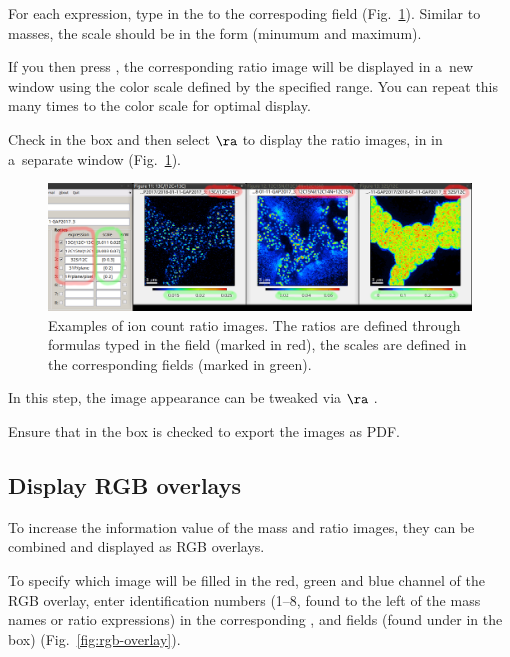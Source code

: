 \s For each expression, type in the  to the correspoding field (Fig.~\ref{fig:display-ratios}). Similar to masses, the scale should be in the form  (minumum and maximum). 

\bul If you then press , the corresponding ratio image will be displayed in a~new window using the color scale defined by the specified range. You can repeat this many times to  the color scale for optimal display.

\s Check  in the  box and then select  $\ra$  to display the ratio images, in in a~separate window (Fig.~\ref{fig:display-ratios}). 

\begin{figure}[!ht]
\centering
\includegraphics[width=\textwidth]{figs3/LANS-display-ratios}
\caption{\label{fig:display-ratios}%
Examples of ion count ratio images. The ratios are defined through formulas typed in the  field (marked in red), the scales are defined in the corresponding  fields (marked in green).}
\end{figure}

\bul In this step, the image appearance can be tweaked via  $\ra$ .

\bul Ensure that  in the  box is checked to export the images as PDF.


\subsection{Display RGB overlays}
\setcounter{step}{0}

To increase the information value of the mass and ratio images, they can be combined and displayed as RGB overlays.

\s To specify which image will be filled in the red, green and blue channel of the RGB overlay, enter identification numbers (1--8, found to the left of the mass names or ratio expressions) in the corresponding ,  and  fields (found under  in the  box) (Fig.~\ref{fig:rgb-overlay}).

